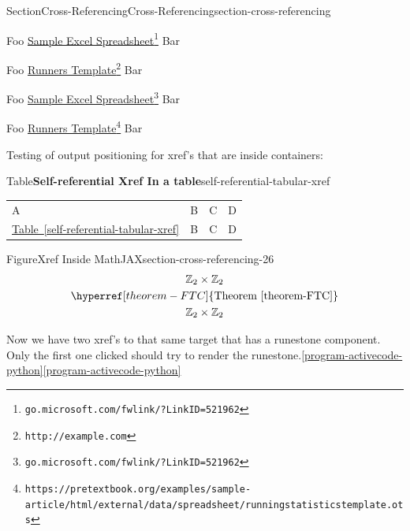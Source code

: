 \documentclass[twoside,10pt,]{article}
\newcommand{\tabularfont}{\relax}
\newcommand{\xreffont}{\relax}
\numberwithin{equation}{section}
\newcommand{\hrulemedium}{\noalign{\hrule height 0.07em}}
\begin{document}
\begin{sectionptx}{Section}{Cross-Referencing}{}{Cross-Referencing}{}{}{section-cross-referencing}
\par
Foo \href{http://go.microsoft.com/fwlink/?LinkID=521962}{Sample Excel Spreadsheet}\footnote{\nolinkurl{go.microsoft.com/fwlink/?LinkID=521962}\label{section-cross-referencing-20-2}} Bar%
\par
Foo \href{https://pretextbook.org/examples/sample-article/html/external/data/spreadsheet/runningstatisticstemplate.ots}{Runners Template}\footnote{\nolinkurl{http://example.com}\label{section-cross-referencing-21-2}} Bar%
\par
Foo \href{http://go.microsoft.com/fwlink/?LinkID=521962}{Sample Excel Spreadsheet}\footnote{\nolinkurl{go.microsoft.com/fwlink/?LinkID=521962}\label{section-cross-referencing-22-2}} Bar%
\par
Foo \href{https://pretextbook.org/examples/sample-article/html/external/data/spreadsheet/runningstatisticstemplate.ots}{Runners Template}\footnote{\nolinkurl{https://pretextbook.org/examples/sample-article/html/external/data/spreadsheet/runningstatisticstemplate.ots}\label{section-cross-referencing-23-2}} Bar%
\par
Testing of output positioning for xref's that are inside containers:%
\begin{tableptx}{Table}{\textbf{Self-referential Xref In a table}}{self-referential-tabular-xref}{}%
\centering%
{\tabularfont%
\begin{tabular}{llll}
A&B&C&D\tabularnewline\hrulemedium
\hyperref[self-referential-tabular-xref]{Table~{\xreffont\ref{self-referential-tabular-xref}}}&B&C&D
\end{tabular}
}%
\end{tableptx}%
\begin{figureptx}{Figure}{Xref Inside MathJAX}{section-cross-referencing-26}{}%
\centering
%
\begin{gather*}
{\mathbb Z}_2 \times {\mathbb Z}_2\\
\hyperref[theorem-FTC]{\text{Theorem {\xreffont\ref{theorem-FTC}}}}\\
{\mathbb Z}_2 \times {\mathbb Z}_2
\end{gather*}
%
\tcblower
\end{figureptx}%
Now we have two xref's to that same target that has a runestone component. Only the first one clicked should try to render the runestone.\hyperref[program-activecode-python]{{\xreffont\ref{program-activecode-python}}}\hyperref[program-activecode-python]{{\xreffont\ref{program-activecode-python}}}%
\end{sectionptx}
%
%
\typeout{************************************************}
\end{document}
